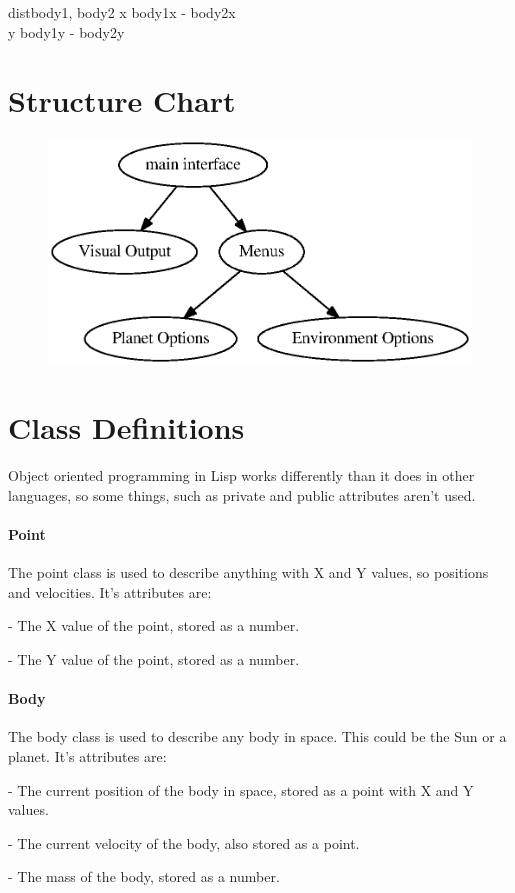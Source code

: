 \begin{pseudocode}{dist}{body1, body2}
	x \GETS \lvert body1x - body2x \lvert \\
	y \GETS \lvert body1y - body2y \lvert \\
\end{pseudocode}


\section{Structure Chart}
\begin{figure}[h]
	\includegraphics[width=\textwidth]{./img/hier.eps}
\end{figure}

\section{Class Definitions}
Object oriented programming in Lisp works differently than it does in other
languages, so some things, such as private and public attributes aren't used. 

\paragraph{Point} The point class is used to describe anything with X and Y
values, so positions and velocities. It's attributes are:
\begin{description}[\parindent]
	\item[X] - The X value of the point, stored as a number.
	\item[Y] - The Y value of the point, stored as a number.
\end{description}

\paragraph{Body} The body class is used to describe any body in space. This
could be the Sun or a planet. It's attributes are:
\begin{description}[\parindent]
	\item[pos] - The current position of the body in space, stored as a
		point with X and Y values.
	\item[vel] - The current velocity of the body, also stored as a point.
	\item[mass] - The mass of the body, stored as a number.
\end{description}

